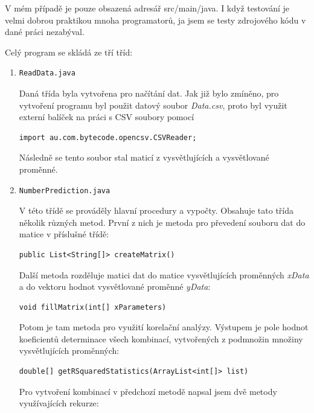 \documentclass[a4paper,12pt,twoside]{scrreprt}
\begin{document}
V mém případě je pouze obsazená adresář src/main/java. I když testování je velmi dobrou praktikou mnoha programatorů, ja jsem se testy zdrojového kódu v dané práci nezabýval. 

Celý program se skládá ze tří tříd: 

\begin{enumerate}
\item \begin{lstlisting}
ReadData.java
\end{lstlisting}

Daná třída byla vytvořena pro načítání dat. Jak již bylo zmíněno, pro vytvoření programu byl použit datový soubor \textit{Data.csv}, proto byl využit externí balíček na práci s CSV soubory pomocí

\begin{lstlisting}
import au.com.bytecode.opencsv.CSVReader;
\end{lstlisting}

Následně se tento soubor stal maticí z vysvětlujících a vysvětlované proměnné. 

\item \begin{lstlisting}
NumberPrediction.java
\end{lstlisting}

V této třídě se prováděly hlavní procedury a vypočty. Obsahuje tato třída několik různých metod. 
První z nich je metoda pro převedení souboru dat do matice v příslušné třídě:

\begin{lstlisting}
public List<String[]> createMatrix()
\end{lstlisting}

Další metoda rozděluje matici dat do matice vysvětlujících proměnných \textit{xData} a do vektoru hodnot vysvětlované proměnné \textit{yData}:

\begin{lstlisting}
void fillMatrix(int[] xParameters) 
\end{lstlisting}

Potom je tam metoda pro využití korelační analýzy. Výstupem je pole hodnot koeficientů determinace všech kombinací, vytvořených z podmnožin množiny vysvětlujících proměnných:

\begin{lstlisting}
double[] getRSquaredStatistics(ArrayList<int[]> list)
\end{lstlisting}

Pro vytvoření kombinací v předchozí metodě napsal jsem dvě metody využívajících rekurze:


\end{enumerate}
\end{document}
